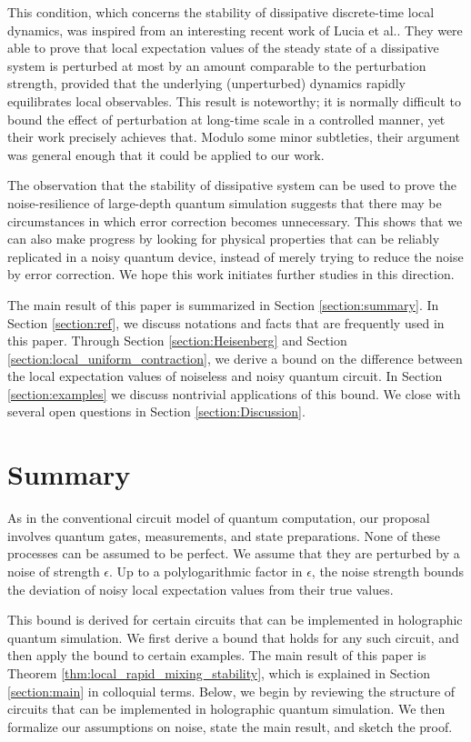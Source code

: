 \documentclass[prx,aps,amsmath,amssymb,floatfix,superscriptaddress,11pt,tightenlines,longbibliography,onecolumn,notitlepage]{revtex4-1}
\begin{document}
This condition, which concerns the stability of dissipative discrete-time local dynamics, was inspired from an interesting recent work of Lucia et al.\cite{Cubitt2013,Lucia2014}. They were able to prove that local expectation values of the steady state of a dissipative system is perturbed at most by an amount comparable to the perturbation strength, provided that the underlying (unperturbed) dynamics rapidly equilibrates local observables. This result is noteworthy; it is normally difficult to bound the effect of perturbation at long-time scale in a controlled manner, yet their work precisely achieves that. Modulo some minor subtleties, their argument was general enough that it could be applied to our work.

The observation that the stability of dissipative system can be used to prove the noise-resilience of large-depth quantum simulation suggests that there may be circumstances in which error correction becomes unnecessary. This shows that we can also make progress by looking for physical properties that can be reliably replicated in a noisy quantum device, instead of merely trying to reduce the noise by error correction. We hope this work initiates further studies in this direction. 

The main result of this paper is summarized in Section \ref{section:summary}. In Section \ref{section:ref}, we discuss notations and facts that are frequently used in this paper. Through Section \ref{section:Heisenberg} and Section \ref{section:local_uniform_contraction}, we derive a bound on the difference between the local expectation values of noiseless and noisy quantum circuit. In Section \ref{section:examples} we discuss nontrivial applications of this bound. We close with several open questions in Section \ref{section:Discussion}.  

\section{Summary\label{section:summary}}
As in the conventional circuit model of quantum computation, our proposal\cite{Kim2017a} involves quantum gates, measurements, and state preparations. None of these processes can be assumed to be perfect. We assume that they are perturbed by a noise of strength  $\epsilon$. Up to a polylogarithmic factor in $\epsilon$, the noise strength bounds the deviation of noisy local expectation values from their true values.

This bound is derived for certain circuits that can be implemented in holographic quantum simulation\cite{Kim2017a}. We first derive a bound that holds for any such circuit, and then apply the bound to certain examples. The main result of this paper is Theorem \ref{thm:local_rapid_mixing_stability}, which is explained in Section \ref{section:main} in colloquial terms. Below, we begin by reviewing the structure of circuits that can be implemented in holographic quantum simulation. We then formalize our assumptions on noise, state the main result, and sketch the proof.
\end{document}
